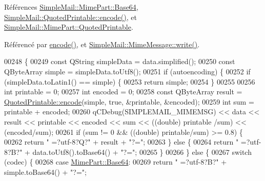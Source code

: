 Références \hyperlink{class_simple_mail_1_1_mime_part_ae67a2f5406958b95b18bf31a7bbeb5c9ae644dc14ba856889814d2da9c995b91a}{Simple\+Mail\+::\+Mime\+Part\+::\+Base64}, \hyperlink{class_simple_mail_1_1_quoted_printable_a8426b74cafe1c93232ac60d3f077c9e8}{Simple\+Mail\+::\+Quoted\+Printable\+::encode()}, et \hyperlink{class_simple_mail_1_1_mime_part_ae67a2f5406958b95b18bf31a7bbeb5c9a29b5533d69a04cfef2c3ff6538c44db0}{Simple\+Mail\+::\+Mime\+Part\+::\+Quoted\+Printable}.



Référencé par \hyperlink{class_simple_mail_1_1_mime_message_private_a44bd454950e1fd6b48a29d2a7b11ca33}{encode()}, et \hyperlink{class_simple_mail_1_1_mime_message_ae7fff977d1c558ddc6711416fe0ff723}{Simple\+Mail\+::\+Mime\+Message\+::write()}.


\begin{DoxyCode}
00248 \{
00249     \textcolor{keyword}{const} QString simpleData = data.simplified();
00250     \textcolor{keyword}{const} QByteArray simple = simpleData.toUtf8();
00251     \textcolor{keywordflow}{if} (autoencoding) \{
00252         \textcolor{keywordflow}{if} (simpleData.toLatin1() == simple) \{
00253             \textcolor{keywordflow}{return} simple;
00254         \}
00255 
00256         \textcolor{keywordtype}{int} printable = 0;
00257         \textcolor{keywordtype}{int} encoded = 0;
00258         \textcolor{keyword}{const} QByteArray result = \hyperlink{class_simple_mail_1_1_quoted_printable_a8426b74cafe1c93232ac60d3f077c9e8}{QuotedPrintable::encode}(simple, \textcolor{keyword}{true}, &printable, 
      &encoded);
00259         \textcolor{keywordtype}{int} sum = printable + encoded;
00260         qCDebug(SIMPLEMAIL\_MIMEMSG) << data << result << printable << encoded << sum << ((double) printable
      /sum) << (encoded/sum);
00261         \textcolor{keywordflow}{if} (sum != 0 && ((\textcolor{keywordtype}{double}) printable/sum) >= 0.8) \{
00262             \textcolor{keywordflow}{return} \textcolor{stringliteral}{" =?utf-8?Q?"} + result + \textcolor{stringliteral}{"?="};
00263         \} \textcolor{keywordflow}{else} \{
00264             \textcolor{keywordflow}{return} \textcolor{stringliteral}{" =?utf-8?B?"} + data.toUtf8().toBase64() + \textcolor{stringliteral}{"?="};
00265         \}
00266     \} \textcolor{keywordflow}{else} \{
00267         \textcolor{keywordflow}{switch} (codec) \{
00268         \textcolor{keywordflow}{case} \hyperlink{class_simple_mail_1_1_mime_part_ae67a2f5406958b95b18bf31a7bbeb5c9ae644dc14ba856889814d2da9c995b91a}{MimePart::Base64}:
00269             \textcolor{keywordflow}{return} \textcolor{stringliteral}{" =?utf-8?B?"} + simple.toBase64() + \textcolor{stringliteral}{"?="};

\end{DoxyCode}
